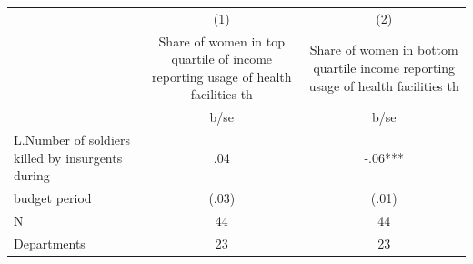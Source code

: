 {
\def\sym#1{\ifmmode^{#1}\else\(^{#1}\)\fi}
\begin{tabular}{l*{2}{c}}
\hline\hline
                                                  &\multicolumn{1}{c}{(1)}&\multicolumn{1}{c}{(2)}\\
                                                  &\multicolumn{1}{c}{Share of women in top quartile of income reporting usage of health facilities th}&\multicolumn{1}{c}{Share of women in bottom quartile income reporting usage of health facilities th}\\
                                                  &        b/se   &        b/se   \\
\hline
L.Number of soldiers killed by insurgents during  &         .04   &        -.06***\\
budget period                                     &       (.03)   &       (.01)   \\
\hline
N                                                 &          44   &          44   \\
Departments                                       &          23   &          23   \\
\hline\hline
\end{tabular}
}
